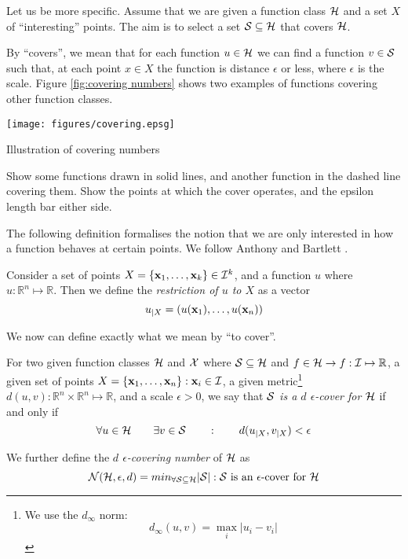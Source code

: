 Let us be more specific.  Assume that we are given a function class
$\mathcal{H}$ and a set $X$ of ``interesting'' points.  The aim is to select
a set $\mathcal{S} \subseteq \mathcal{H}$ that covers $\mathcal{H}$.

By ``covers'', we  mean that for each function $u \in \mathcal{H}$ we can
find a function $v \in \mathcal{S}$ such that, at each point $x \in X$ the
function is distance $\epsilon$ or less, where $\epsilon$ is the
scale.  Figure \ref{fig:covering numbers} shows two examples of
functions covering other function classes.

\begin{linefigure}
\begin{center}
\texttt{[image: figures/covering.epsg]}
\end{center}
\caption{Illustration of covering numbers}
Show some functions drawn in solid lines, and another function in the
dashed line covering them.  Show the points at which the cover
operates, and the epsilon length bar either side.
\end{linefigure}

The following definition formalises the notion that we are only
interested in how a function behaves at certain points.  We follow
Anthony and Bartlett \cite{Anthony98}.

\begin{definition}
\label{def:restriction}
Consider a set of points $X = \{\mathbf{x}_1, \ldots, \mathbf{x}_k\} \in \mathcal{I}^k$,
and a function $u$ where $u : \mathbb{R}^n \mapsto \mathbb{R}$.  Then
we define the \emph{restriction of $u$ to $X$} as a vector
%
\begin{equation}
u_{|X} = (u(\mathbf{x}_1), \ldots, u(\mathbf{x}_n))
\end{equation}
\end{definition}

We now can define exactly what we mean by ``to cover''.

\begin{definition}
\label{def:covering}
\label{def:covering numbers}
For two given function classes $\mathcal{H}$ and $\mathcal{X}$ where $\mathcal{S}
\subseteq \mathcal{H}$ and $f \in \mathcal{H} \rightarrow f : \mathcal{I} \mapsto
\mathbb{R}$, a given set of points $X = \{\mathbf{x}_1, \ldots, \mathbf{x}_n\} : \mathbf{x}_i \in
\mathcal{I}$, a given metric\footnote{We use the $d_{\infty}$ norm: 
\[ d_{\infty}(u, v) = \max_{i} |u_i - v_i| \]} $d(u, v) : \mathbb{R}^n
\times \mathbb{R}^n \mapsto 
\mathbb{R}$, and a scale $\epsilon > 0$, we say that \emph{$\mathcal{S}$ is a
$d$ $\epsilon$-cover for $\mathcal{H}$} if and only if
\begin{equation}
\forall u \in \mathcal{H} \qquad \exists v \in \mathcal{S} \qquad : \qquad
d(u_{|X}, v_{|X}) < \epsilon
\end{equation}

We further define the \emph{$d$ $\epsilon$-covering number} of $\mathcal{H}$
as 
\begin{equation}
\mathcal{N}({\mathcal{H}}, {\epsilon}, {d}) = min_{\forall \mathcal{S} \subseteq
\mathcal{H}}|\mathcal{S}| : \mbox{$\mathcal{S}$ is an $\epsilon$-cover for $\mathcal{H}$}
\end{equation}
\end{definition}

